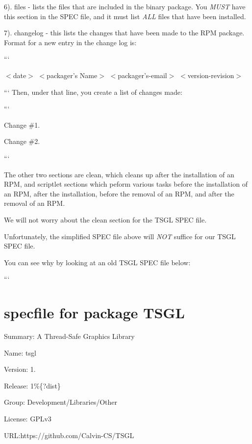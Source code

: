 6). {\ttfamily files} -\/ lists the files that are included in the binary package. You {\itshape M\-U\-S\-T} have this section in the S\-P\-E\-C file, and it must list {\itshape A\-L\-L} files that have been installed.

7). {\ttfamily changelog} -\/ this lists the changes that have been made to the R\-P\-M package. Format for a new entry in the change log is\-:

```
\begin{DoxyItemize}
\item $<$date$>$ $<$packager's Name$>$ $<$packager's-\/email$>$ $<$version-\/revision$>$
\end{DoxyItemize}

``` Then, under that line, you create a list of changes made\-:

```
\begin{DoxyItemize}
\item Change \#1.
\item Change \#2.
\end{DoxyItemize}```

The other two sections are {\ttfamily clean}, which cleans up after the installation of an R\-P\-M, and scriptlet sections which peform various tasks before the installation of an R\-P\-M, after the installation, before the removal of an R\-P\-M, and after the removal of an R\-P\-M.

We will not worry about the {\ttfamily clean} section for the T\-S\-G\-L S\-P\-E\-C file.

Unfortunately, the simplified S\-P\-E\-C file above will {\itshape N\-O\-T} suffice for our T\-S\-G\-L S\-P\-E\-C file.

You can see why by looking at an old T\-S\-G\-L S\-P\-E\-C file below\-:

```

\section*{specfile for package T\-S\-G\-L}

Summary\-: A Thread-\/\-Safe Graphics Library

Name\-: tsgl

Version\-: 1.

Release\-: 1\%\{?dist\}

Group\-: Development/\-Libraries/\-Other

License\-: G\-P\-Lv3

U\-R\-L\-:https\-://github.com/\-Calvin-\/\-C\-S/\-T\-S\-G\-L

